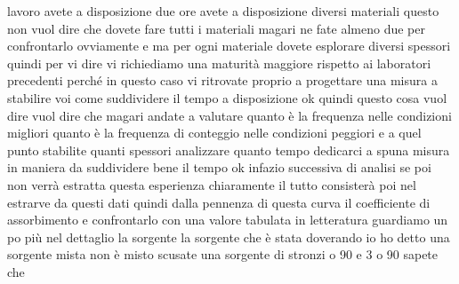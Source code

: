 {lavoro avete a disposizione due ore avete a disposizione diversi materiali questo non vuol dire che dovete fare tutti i materiali magari ne fate almeno due per confrontarlo ovviamente e ma per ogni materiale dovete esplorare diversi spessori quindi per vi dire vi richiediamo una maturità maggiore rispetto ai laboratori precedenti perché in questo caso vi ritrovate proprio a progettare una misura a stabilire voi come suddividere il tempo a disposizione ok quindi questo cosa vuol dire vuol dire che magari andate a valutare quanto è la frequenza nelle condizioni migliori quanto è la frequenza di conteggio nelle condizioni peggiori e a quel punto stabilite quanti spessori analizzare quanto tempo dedicarci a spuna misura in maniera da suddividere bene il tempo ok infazio successiva di analisi se poi non verrà estratta questa esperienza chiaramente il tutto consisterà poi nel estrarve da questi dati quindi dalla pennenza di questa curva il coefficiente di assorbimento e confrontarlo con una valore tabulata in letteratura guardiamo un po più nel dettaglio la sorgente la sorgente che è stata doverando io ho detto una sorgente mista non è misto scusate una sorgente di stronzi o 90 e 3 o 90 sapete che

}
